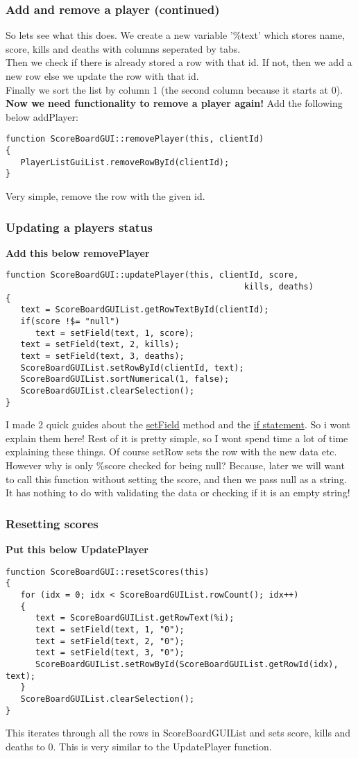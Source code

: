 \begin{frame}[fragile]
\frametitle{Add and remove a player (continued)}
So lets see what this does. We create a new variable '\%text' which stores name, score, kills and deaths with columns seperated by tabs.\\
Then we check if there is already stored a row with that id. If not, then we add a new row else we update the row with that id.\\
Finally we sort the list by column 1 (the second column because it starts at 0).\\
{\bf Now we need functionality to remove a player again!} Add the following below addPlayer:
\TS
\begin{lstlisting}
function ScoreBoardGUI::removePlayer(this, clientId)
{
   PlayerListGuiList.removeRowById(clientId);
}
\end{lstlisting}
Very simple, remove the row with the given id.
\end{frame}

\begin{frame}[fragile]
\frametitle{Updating a players status}
{\bf Add this below removePlayer}
\TS
\begin{lstlisting}
function ScoreBoardGUI::updatePlayer(this, clientId, score, 
                                                kills, deaths)
{
   text = ScoreBoardGUIList.getRowTextById(clientId);
   if(score !$= "null")
      text = setField(text, 1, score);
   text = setField(text, 2, kills);
   text = setField(text, 3, deaths);
   ScoreBoardGUIList.setRowById(clientId, text);
   ScoreBoardGUIList.sortNumerical(1, false);
   ScoreBoardGUIList.clearSelection();
}
\end{lstlisting}
I made 2 quick guides about the {\color{blue} \hyperlink{QG-FieldsAndWords}{setField}} method and the {\color{blue} \hyperlink{QG-IfStatements}{if statement}}. So i wont explain them here!
Rest of it is pretty simple, so I wont spend time a lot of time explaining these things. Of course setRow sets the row with the new data etc.\\
However why is only \%score checked for being null? Because, later we will want to call this function without setting the score, and then we pass null as a string.
It has nothing to do with validating the data or checking if it is an empty string! 
\end{frame}

\begin{frame}[fragile]
\frametitle{Resetting scores}
{\bf Put this below UpdatePlayer}
\TS
\begin{lstlisting}
function ScoreBoardGUI::resetScores(this)
{
   for (idx = 0; idx < ScoreBoardGUIList.rowCount(); idx++)
   {
      text = ScoreBoardGUIList.getRowText(%i);
      text = setField(text, 1, "0");
      text = setField(text, 2, "0");
      text = setField(text, 3, "0");
      ScoreBoardGUIList.setRowById(ScoreBoardGUIList.getRowId(idx), text);
   }
   ScoreBoardGUIList.clearSelection();
}
\end{lstlisting}
This iterates through all the rows in ScoreBoardGUIList and sets score, kills and deaths to 0. This is very similar to the UpdatePlayer function.
\end{frame}

